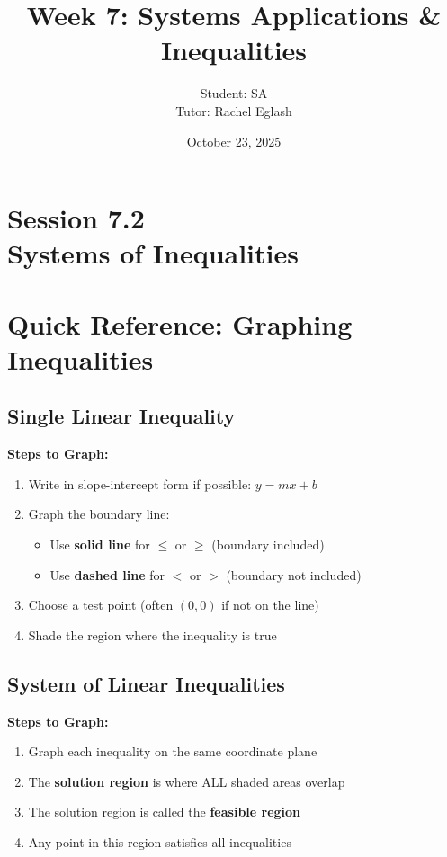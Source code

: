 \documentclass[12pt]{article}
\title{Week 7: Systems Applications \& Inequalities}
\author{
	Student: SA\\
	Tutor: Rachel Eglash}
\date{October 23, 2025}
\begin{document}
	
	\maketitle
	
	\section*{Session 7.2 \\ Systems of Inequalities}
	
	    \newpage
	
	\section*{Quick Reference: Graphing Inequalities}
	
	    \subsection*{Single Linear Inequality}
	
	        \textbf{Steps to Graph:}
	        \begin{enumerate}
	    	    \item Write in slope-intercept form if possible: $y = mx + b$
	    	    \item Graph the boundary line:
	    	    \begin{itemize}
	    		    \item Use \textbf{solid line} for $\leq$ or $\geq$ (boundary included)
		    	    \item Use \textbf{dashed line} for $<$ or $>$ (boundary not included)
	    	    \end{itemize}
	    	    \item Choose a test point (often $(0,0)$ if not on the line)
		        \item Shade the region where the inequality is true
	        \end{enumerate}
	
	    \subsection*{System of Linear Inequalities}
	
	        \textbf{Steps to Graph:}
    	    \begin{enumerate}
	            \item Graph each inequality on the same coordinate plane
		        \item The \textbf{solution region} is where ALL shaded areas overlap
	    	    \item The solution region is called the \textbf{feasible region}
	        	\item Any point in this region satisfies all inequalities
	        \end{enumerate}
	
\end{document}
